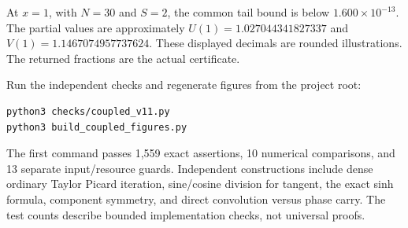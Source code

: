 At \(x=1\), with \(N=30\) and \(S=2\), the common tail bound is below
\(1.600\times10^{-13}\). The partial values are approximately
\(U(1)=1.027044341827337\) and \(V(1)=1.1467074957737624\). These
displayed decimals are rounded illustrations. The returned fractions are
the actual certificate.

Run the independent checks and regenerate figures from the project root:

\begin{verbatim}
python3 checks/coupled_v11.py
python3 build_coupled_figures.py
\end{verbatim}

The first command passes 1,559 exact assertions, 10 numerical
comparisons, and 13 separate input/resource guards. Independent
constructions include dense ordinary Taylor Picard iteration,
sine/cosine division for tangent, the exact sinh formula, component
symmetry, and direct convolution versus phase carry. The test counts
describe bounded implementation checks, not universal proofs.

